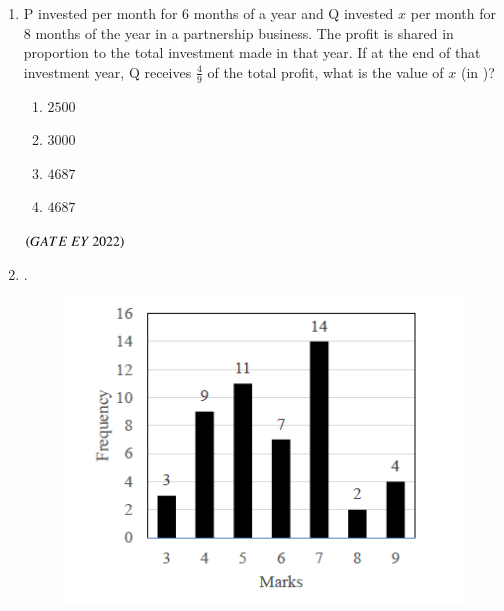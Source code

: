 \documentclass[journal]{IEEEtran}
\numberwithin{equation}{enumi}
\numberwithin{figure}{enumi}
\begin{document}
\begin{enumerate}
     \item P invested  per month for $6$ months of a year and Q invested \rupee $x$  per
month for $8$ months of the year in a partnership business. The profit is shared in
proportion to the total investment made in that year.
If at the end of that investment year, Q receives $\frac{4}{9}$ 
of the total profit, what is the
value of $x$ (in \rupee)?
    \begin{enumerate}
        \item  $2500$
        \item  $3000$
        \item  $4687$
        \item  $4687$
    \end{enumerate}
    \hfill{$\brak{ GATE\ EY\ 2022}$}
    \bigskip
 \item  .
 \begin{figure}[H]
    \centering
\includegraphics[width=0.5\columnwidth]{figs/2.png}
    \caption{}
    \label{fig:2}
   \end{figure}
   

\end{enumerate}
\end{document}
